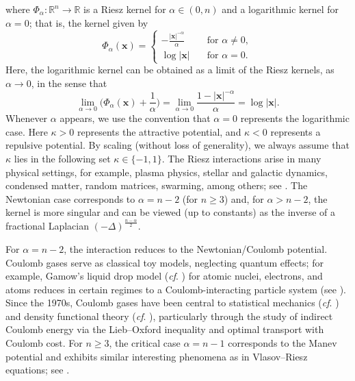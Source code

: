 \documentclass[reqno,11pt]{amsart}
\numberwithin{equation}{section}
\theoremstyle{definition}
\begin{document}
 where $\Phi_\alpha: \mathbb{R}^n \to \mathbb{R}$ is a Riesz kernel for $\alpha \in (0,n)$ 
 and a logarithmic kernel for $\alpha = 0$; that is, the kernel given by
 \[
 \Phi_\alpha(\boldsymbol{x}) =
 \begin{cases}
     -\frac{|\boldsymbol{x}|^{-\alpha}}{\alpha} &\quad \text{for } \alpha \neq 0, \\
     \log|\boldsymbol{x}| &\quad \text{for } \alpha = 0.
 \end{cases}
 \]
 Here, the logarithmic kernel can be obtained as a limit of the Riesz kernels, as $\alpha \to 0$, 
 in the sense that
 \begin{equation*}
    \lim_{\alpha \to 0} \big(\Phi_\alpha (\boldsymbol{x})+ \frac1{\alpha}\big) 
    = \lim_{\alpha \to 0} \frac{1-|\boldsymbol{x}|^{-\alpha}}{\alpha}
    = \log |\boldsymbol{x}|.
\end{equation*}
Whenever $\alpha$ appears, we use the convention that $\alpha = 0$ represents the logarithmic case. Here $\kappa > 0$ represents the attractive potential, and $\kappa < 0$ represents a repulsive potential. 
By scaling (without loss of generality), we always assume that $\kappa$ 
lies in the following set $\kappa \in \{-1,1\}$. 
The Riesz interactions arise in many physical settings, 
for example, plasma physics, stellar and galactic dynamics, condensed matter, random matrices, 
swarming, among others;
see \cite{Campa_2014,Lewin_2017,Cotar_2019,Lewin_2022,Carrillo_2021,Carrillo_2017}.
The Newtonian case corresponds to $\alpha=n-2$ (for $n\ge 3$) 
and, for $\alpha>n-2$, the kernel is more singular and can be viewed (up to constants) 
as the inverse of a fractional Laplacian $(-\Delta)^{\frac{n-\alpha}{2}}$.

\smallskip
For $\alpha = n-2$, the interaction reduces to the Newtonian/Coulomb potential. 
Coulomb gases serve as classical toy models, neglecting quantum effects; 
for example, Gamow’s liquid drop model ({\it cf}. \cite{Serfaty:2024ojp}) for atomic nuclei, electrons, 
and atoms reduces in certain regimes to a Coulomb-interacting particle system (see \cite{Alberti_2009}). 
Since the 1970s, Coulomb gases have been central to statistical mechanics ({\it cf}. \cite{Lieb_1969}) 
and density functional theory ({\it cf}. \cite{Lieb_2010,Lewin_2017,Cotar_2013,Cotar_2019}), 
particularly through the study of indirect Coulomb energy via the Lieb–Oxford inequality 
and optimal transport with Coulomb cost. 
For $n\ge3$, the critical case $\alpha=n-1$ corresponds to the Manev potential and exhibits similar interesting phenomena as in Vlasov--Riesz equations; see \cite{Bobylev,Cercignani,Illner}.
\end{document}
